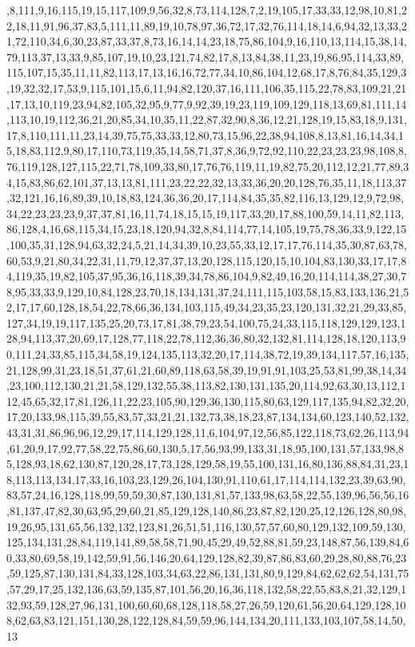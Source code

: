 \documentclass[11pt]{article}
\begin{document}
\begin{vncode}
,8,111,9,16,115,19,15,117,109,9,56,32,8,73,114,128,7,2,19,105,17,33,33,12,98,10,81,22,18,11,91,96,37,83,5,111,11,89,19,10,78,97,36,72,17,32,76,114,18,14,6,94,32,13,33,21,72,110,34,6,30,23,87,33,37,8,73,16,14,14,23,18,75,86,104,9,16,110,13,114,15,38,14,79,113,37,13,33,9,85,107,19,10,23,121,74,82,17,8,13,84,38,11,23,19,86,95,114,33,89,115,107,15,35,11,11,82,113,17,13,16,16,72,77,34,10,86,104,12,68,17,8,76,84,35,129,3,19,32,32,17,53,9,115,101,15,6,11,94,82,120,37,16,111,106,35,115,22,78,83,109,21,21,17,13,10,119,23,94,82,105,32,95,9,77,9,92,39,19,23,119,109,129,118,13,69,81,111,14,113,10,19,112,36,21,20,85,34,10,35,11,22,87,32,90,8,36,12,21,128,19,15,83,18,9,131,17,8,110,111,11,23,14,39,75,75,33,33,12,80,73,15,96,22,38,94,108,8,13,81,16,14,34,15,18,83,112,9,80,17,110,73,119,35,14,58,71,37,8,36,9,72,92,110,22,23,23,23,98,108,8,76,119,128,127,115,22,71,78,109,33,80,17,76,76,119,11,19,82,75,20,112,12,21,77,89,34,15,83,86,62,101,37,13,13,81,111,23,22,22,32,13,33,36,20,20,128,76,35,11,18,113,37,32,121,16,16,89,39,10,18,83,124,36,36,20,17,114,84,35,35,82,116,13,129,12,9,72,98,34,22,23,23,23,9,37,37,81,16,11,74,18,15,15,19,117,33,20,17,88,100,59,14,11,82,113,86,128,4,16,68,115,34,15,23,18,120,94,32,8,84,114,77,14,105,19,75,78,36,33,9,122,15,100,35,31,128,94,63,32,24,5,21,14,34,39,10,23,55,33,12,17,17,76,114,35,30,87,63,78,60,53,9,21,80,34,22,31,11,79,12,37,37,13,20,128,115,120,15,10,104,83,130,33,17,17,84,119,35,19,82,105,37,95,36,16,118,39,34,78,86,104,9,82,49,16,20,114,114,38,27,30,78,95,33,33,9,129,10,84,128,23,70,18,134,131,37,24,111,115,103,58,15,83,133,136,21,52,17,17,60,128,18,54,22,78,66,36,134,103,115,49,34,23,35,23,120,131,32,21,29,33,85,127,34,19,19,117,135,25,20,73,17,81,38,79,23,54,100,75,24,33,115,118,129,129,123,128,94,113,37,20,69,17,128,77,118,22,78,112,36,36,80,32,132,81,114,128,18,120,113,90,111,24,33,85,115,34,58,19,124,135,113,32,20,17,114,38,72,19,39,134,117,57,16,135,21,128,99,31,23,18,51,37,61,21,60,89,118,63,58,39,19,91,91,103,25,53,81,99,38,14,34,23,100,112,130,21,21,58,129,132,55,38,113,82,130,131,135,20,114,92,63,30,13,112,112,45,65,32,17,81,126,11,22,23,105,90,129,36,130,115,80,63,129,117,135,94,82,32,20,17,20,133,98,115,39,55,83,57,33,21,21,132,73,38,18,23,87,134,134,60,123,140,52,132,43,31,31,86,96,96,12,29,17,114,129,128,11,6,104,97,12,56,85,122,118,73,62,26,113,94,61,20,9,17,92,77,58,22,75,86,60,130,5,17,56,93,99,133,31,18,95,100,131,57,133,98,85,128,93,18,62,130,87,120,28,17,73,128,129,58,19,55,100,131,16,80,136,88,84,31,23,18,113,113,134,17,33,16,103,23,129,26,104,130,91,110,61,17,114,114,132,23,39,63,90,83,57,24,16,128,118,99,59,59,30,87,130,131,81,57,133,98,63,58,22,55,139,96,56,56,16,81,137,47,82,30,63,95,29,60,21,85,129,128,140,86,23,87,82,120,25,12,126,128,80,98,19,26,95,131,65,56,132,132,123,81,26,51,51,116,130,57,57,60,80,129,132,109,59,130,125,134,131,28,84,119,141,89,58,58,71,90,45,29,49,52,88,81,59,23,148,87,56,139,84,60,33,80,69,58,19,142,59,91,56,146,20,64,129,128,82,39,87,86,83,60,29,28,80,88,76,23,59,125,87,130,131,84,33,128,103,34,63,22,86,131,131,80,9,129,84,62,62,62,54,131,75,57,29,17,25,132,136,63,59,135,87,101,56,20,16,36,118,132,58,22,55,83,8,21,32,129,132,93,59,128,27,96,131,100,60,60,68,128,118,58,27,26,59,120,61,56,20,64,129,128,108,62,63,83,121,151,130,28,122,128,84,59,59,96,144,134,20,111,133,103,107,58,14,50,13
\end{vncode}
\end{document}
